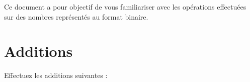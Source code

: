\documentclass[11pt,a4paper]{article}
\begin{document}
\EncadreTitre

\bigskip


%
%

\bigskip


Ce document a pour objectif de vous familiariser avec les opérations effectuées sur des nombres représentés au format binaire.

\bigskip


\section{Additions}


\medskip

Effectuez les additions suivantes :

\bigskip

\vfillFirst
\end{document}
